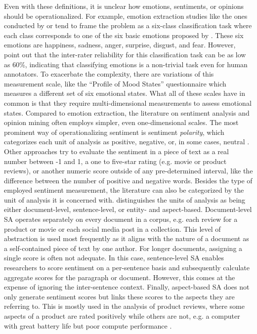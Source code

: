 Even with these definitions, it is unclear how emotions, sentiments, or opinions should be operationalized. For example, emotion extraction studies like the ones conducted by  or  tend to frame the problem as a six-class classification task where each class corresponds to one of the six basic emotions proposed by . These six emotions are happiness, sadness, anger, surprise, disgust, and fear. However,  point out that the inter-rater reliability for this classification task can be as low as 60\%, indicating that classifying emotions is a non-trivial task even for human annotators. To exacerbate the complexity, there are variations of this measurement scale, like the ``Profile of Mood States'' questionnaire  which measures a different set of six emotional states. What all of these scales have in common is that they require multi-dimensional measurements to assess emotional states. \newline
Compared to emotion extraction, the literature on sentiment analysis and opinion mining often employs simpler, even one-dimensional scales. The most prominent way of operationalizing sentiment is sentiment \emph{polarity}, which categorizes each unit of analysis as positive, negative, or, in some cases, neutral \cite{ravi2015survey}. Other approaches try to evaluate the sentiment in a piece of text as a real number between -1 and 1, a one to five-star rating (e.g. movie or product reviews), or another numeric score outside of any pre-determined interval, like the difference between the number of positive and negative words.\newline
Besides the type of employed sentiment measurement, the literature can also be categorized by the unit of analysis it is concerned with.  distinguishes the units of analysis as being either document-level, sentence-level, or entity- and aspect-based. Document-level SA operates separately on every document in a corpus, e.g. each review for a product or movie or each social media post in a collection. This level of abstraction is used most frequently as it aligns with the nature of a document as a self-contained piece of text by one author. For longer documents, assigning a single score is often not adequate. In this case, sentence-level SA enables researchers to score sentiment on a per-sentence basis and subsequently calculate aggregate scores for the paragraph or document. However, this comes at the expense of ignoring the inter-sentence context. Finally, aspect-based SA does not only generate sentiment scores but links these scores to the aspects they are referring to. This is mostly used in the analysis of product reviews, where some aspects of a product are rated positively while others are not, e.g. a computer with great battery life but poor compute performance .

